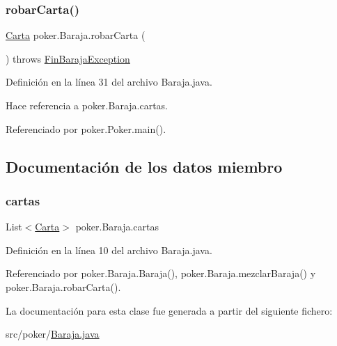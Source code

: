 \subsubsection{\texorpdfstring{robarCarta()}{robarCarta()}}
{\footnotesize\ttfamily \mbox{\hyperlink{classpoker_1_1Carta}{Carta}} poker.\+Baraja.\+robar\+Carta (\begin{DoxyParamCaption}{ }\end{DoxyParamCaption}) throws \mbox{\hyperlink{classpoker_1_1FinBarajaException}{Fin\+Baraja\+Exception}}}



Definición en la línea 31 del archivo Baraja.\+java.


\begin{DoxyCode}{0}

\end{DoxyCode}


Hace referencia a poker.\+Baraja.\+cartas.



Referenciado por poker.\+Poker.\+main().



\subsection{Documentación de los datos miembro}
\mbox{\label{classpoker_1_1Baraja_a267e10bf1a0fadd4b1bfa3f243fdfcf6}} 
\subsubsection{\texorpdfstring{cartas}{cartas}}
{\footnotesize\ttfamily List$<$\mbox{\hyperlink{classpoker_1_1Carta}{Carta}}$>$ poker.\+Baraja.\+cartas\hspace{0.3cm}{\ttfamily [private]}}



Definición en la línea 10 del archivo Baraja.\+java.



Referenciado por poker.\+Baraja.\+Baraja(), poker.\+Baraja.\+mezclar\+Baraja() y poker.\+Baraja.\+robar\+Carta().



La documentación para esta clase fue generada a partir del siguiente fichero\+:\begin{DoxyCompactItemize}
\item 
src/poker/\mbox{\hyperlink{Baraja_8java}{Baraja.\+java}}\end{DoxyCompactItemize}
